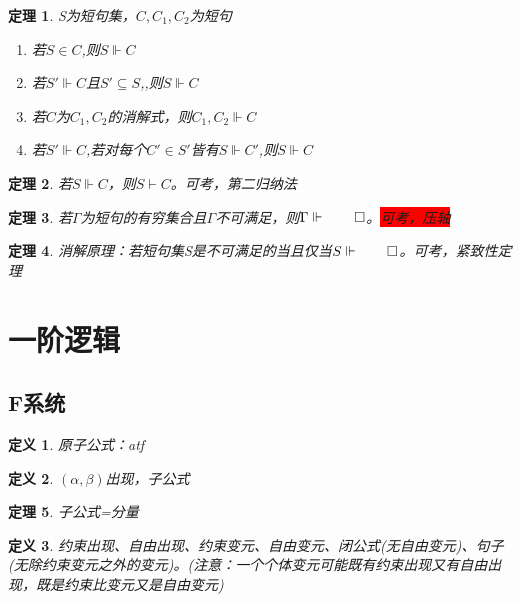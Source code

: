 \documentclass[a4paper]{ctexart}
\newtheorem{thm}{\hspace{2em}定理}[subsection]
\newtheorem{defi}{\hspace{2em}定义}[subsection]
\newcommand{\shade}[1]{\colorbox{shadecolor}{#1}}
\newcommand{\redshade}[1]{\colorbox{red}{#1}}
\begin{document}
\begin{thm}
  S为短句集，$C,C_1,C_2$为短句
  \begin{enumerate}[itemindent=2em]
    \item 若$S\in C$,则$S\Vdash C$
    \item 若$S'\Vdash C$且$S'\subseteq S$,,则$S\Vdash C$
    \item 若$C$为$C_1,C_2$的消解式，则$C_1,C_2\Vdash C$
    \item 若$S'\Vdash C$,若对每个$C'\in S'$皆有$S\Vdash C'$,则$S\Vdash C$
  \end{enumerate}
\end{thm}

\begin{thm}
  若$S\Vdash C$，则$S\vdash C$。\shade{可考，第二归纳法}
\end{thm}

\begin{thm}
  若$\Gamma$为短句的有穷集合且$\Gamma$不可满足，则$\Gamma\Vdash\qed$。\redshade{可考，压轴}
\end{thm}

\begin{thm}
  消解原理：若短句集S是不可满足的当且仅当$S\Vdash \qed$。\shade{可考，紧致性定理}
\end{thm}

\section{一阶逻辑}
\subsection{F系统}
\begin{defi}
  原子公式：atf
\end{defi}

\begin{defi}
  $(\alpha,\beta)$出现，子公式
\end{defi}

\begin{thm}
  子公式=分量
\end{thm}

\begin{defi}
  约束出现、自由出现、约束变元、自由变元、闭公式(无自由变元)、句子(无除约束变元之外的变元)。(注意：一个个体变元可能既有约束出现又有自由出现，既是约束比变元又是自由变元)
\end{defi}
\end{document}
